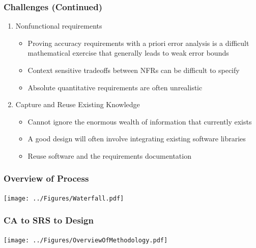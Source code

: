 \documentclass[t,12pt,numbers,fleqn]{beamer}
\newcounter{temp}
\begin{document}

\begin{frame}

\frametitle{Challenges (Continued)}

\begin{enumerate}
\setcounter{enumi}{\value{temp}}
\item Nonfunctional requirements
\begin{itemize}
\item Proving accuracy requirements with a priori error analysis is a difficult mathematical exercise that generally
leads to weak error bounds
\item Context sensitive tradeoffs between NFRs can be difficult to specify
\item Absolute quantitative requirements are often unrealistic
\end{itemize}
\item Capture and Reuse Existing Knowledge
\begin{itemize}
\item Cannot ignore the enormous wealth of information that currently exists %
\item A good design will often involve integrating existing software libraries
\item Reuse software and the requirements documentation
\end{itemize}

\setcounter{temp}{\value{enumi}}
\end{enumerate}

\end{frame}


\begin{frame}
\frametitle{Overview of Process}

\begin{center}
 \texttt{[image: ../Figures/Waterfall.pdf]}
\end{center}

\end{frame}


\begin{frame}

\frametitle{CA to SRS to Design}

\begin{center}
\texttt{[image: ../Figures/OverviewOfMethodology.pdf]}
\end{center}


\end{frame}
\end{document}
